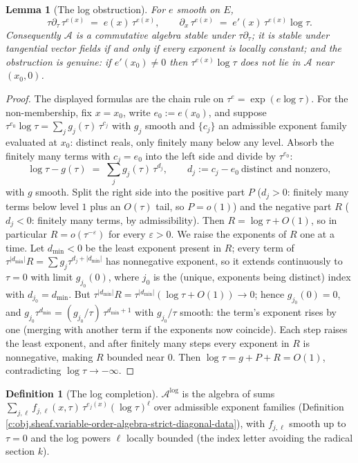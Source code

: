 \documentclass[11pt]{article}
\newtheorem{lemma}[theorem]{Lemma}
\theoremstyle{definition}
\newtheorem{definition}[theorem]{Definition}
\theoremstyle{plain}
\begin{document}
\begin{lemma}[The log obstruction]\label{c:sheaf.log-obstruction}
For $e$ smooth on $E$,
\[
\tau\partial_\tau\,\tau^{e(x)} \;=\; e(x)\,\tau^{e(x)},
\qquad
\partial_x\,\tau^{e(x)} \;=\; e'(x)\,\tau^{e(x)}\log\tau .
\]
Consequently $\mathcal{A}$ is a commutative algebra stable under $\tau\partial_\tau$; it is stable under tangential vector fields if and only if every exponent is locally constant; and the obstruction is genuine: if $e'(x_0) \neq 0$ then $\tau^{e(x)}\log\tau$ does not lie in $\mathcal{A}$ near $(x_0,0)$.
\end{lemma}
\begin{proof}
The displayed formulas are the chain rule on $\tau^e = \exp(e\log\tau)$. For the non-membership, fix $x = x_0$, write $e_0 := e(x_0)$, and suppose $\tau^{e_0}\log\tau = \sum_j g_j(\tau)\,\tau^{c_j}$ with $g_j$ smooth and $\{c_j\}$ an admissible exponent family evaluated at $x_0$: distinct reals, only finitely many below any level. Absorb the finitely many terms with $c_j = e_0$ into the left side and divide by $\tau^{e_0}$:
\[
\log\tau - g(\tau) \;=\; \sum_j g_j(\tau)\,\tau^{d_j}, \qquad d_j := c_j - e_0 \ \text{distinct and nonzero},
\]
with $g$ smooth. Split the right side into the positive part $P$ ($d_j > 0$: finitely many terms below level $1$ plus an $O(\tau)$ tail, so $P = o(1)$) and the negative part $R$ ($d_j < 0$: finitely many terms, by admissibility). Then $R = \log\tau + O(1)$, so in particular $R = o(\tau^{-\varepsilon})$ for every $\varepsilon > 0$. We raise the exponents of $R$ one at a time. Let $d_{\min} < 0$ be the least exponent present in $R$; every term of $\tau^{|d_{\min}|} R = \sum g_j \tau^{d_j + |d_{\min}|}$ has nonnegative exponent, so it extends continuously to $\tau = 0$ with limit $g_{j_0}(0)$, where $j_0$ is the (unique, exponents being distinct) index with $d_{j_0} = d_{\min}$. But $\tau^{|d_{\min}|} R = \tau^{|d_{\min}|}(\log\tau + O(1)) \to 0$; hence $g_{j_0}(0) = 0$, and $g_{j_0} \tau^{d_{\min}} = (g_{j_0}/\tau)\,\tau^{d_{\min}+1}$ with $g_{j_0}/\tau$ smooth: the term's exponent rises by one (merging with another term if the exponents now coincide). Each step raises the least exponent, and after finitely many steps every exponent in $R$ is nonnegative, making $R$ bounded near $0$. Then $\log\tau = g + P + R = O(1)$, contradicting $\log\tau \to -\infty$.

\end{proof}

\begin{definition}[The log completion]\label{c:obj.sheaf.log-completion}
$\mathcal{A}^{\log}$ is the algebra of sums $\sum_{j,\ell} f_{j,\ell}(x,\tau)\,\tau^{e_j(x)}(\log\tau)^{\ell}$ over admissible exponent families (Definition \ref{c:obj.sheaf.variable-order-algebra-strict-diagonal-data}), with $f_{j,\ell}$ smooth up to $\tau = 0$ and the log powers $\ell$ locally bounded (the index letter avoiding the radical section $k$).
\end{definition}
\end{document}
